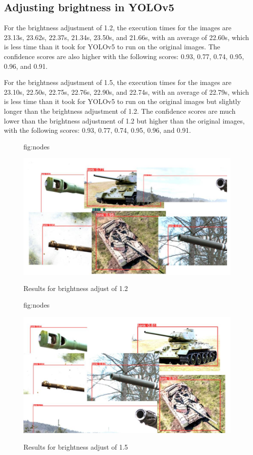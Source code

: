 \documentclass[pmlr,twocolumn,10pt]{jmlr} %
\begin{document}
\subsection{Adjusting brightness in YOLOv5}
\label{sec:figures}

For the brightness adjustment of 1.2, the execution times for the images are 23.13s, 23.62s, 22.37s, 21.34s, 23.50s, and 21.66s, with an average of 22.60s, which is less time than it took for YOLOv5 to run on the original images. The confidence scores are also higher with the following scores: 0.93, 0.77, 0.74, 0.95, 0.96, and 0.91.

For the brightness adjustment of 1.5, the execution times for the images are 23.10s, 22.50s, 22.75s, 22.76s, 22.90s, and 22.74s, with an average of 22.79s, which is less time than it took for YOLOv5 to run on the original images but slightly longer than the brightness adjustment of 1.2. The confidence scores are much lower than the brightness adjustment of 1.2 but higher than the original images, with the following scores: 0.93, 0.77, 0.74, 0.95, 0.96, and 0.91.

\begin{figure}[htbp]
\floatconts
  {fig:nodes}
  {\caption{Results for brightness adjust of 1.2}}
  {\includegraphics[width=1\linewidth]{images/Yolo5Bright12.jpg}}
\end{figure}

\begin{figure}[htbp]
\floatconts
  {fig:nodes}
  {\caption{Results for brightness adjust of 1.5}}
  {\includegraphics[width=1\linewidth]{images/Yolo5Bright15.jpg}}
\end{figure}
\end{document}

